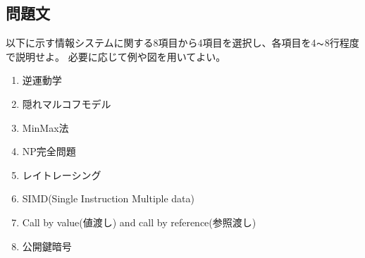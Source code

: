 \subsection{問題文}
以下に示す情報システムに関する8項目から4項目を選択し、各項目を4$\thicksim$8行程度で説明せよ。
必要に応じて例や図を用いてよい。

\begin{enumerate}[(1)]
    \item 逆運動学
    \item 隠れマルコフモデル
    \item MinMax法
    \item NP完全問題
    \item レイトレーシング
    \item SIMD(Single Instruction Multiple data)
    \item Call by value(値渡し) and call by reference(参照渡し)
    \item 公開鍵暗号
\end{enumerate}

\newpage

